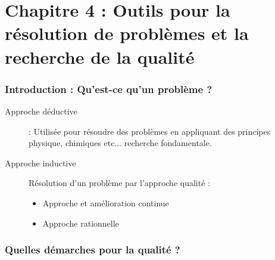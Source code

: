 \part{Chapitre 4 : Outils pour la résolution de problèmes et la recherche de la qualité}

\section{Introduction : Qu’est-ce qu’un problème ?}

\begin{description}
	\item[Approche déductive] : Utilisée pour résoudre des problèmes en appliquant des principes physique, chimiques etc... recherche fondamentale.
	\item[Approche inductive] Résolution d’un problème par l'approche qualité :
	\begin{itemize}
		\item Approche et amélioration continue
		\item Approche rationnelle
	\end{itemize}
\end{description}

\section{Quelles démarches pour la qualité ?}

